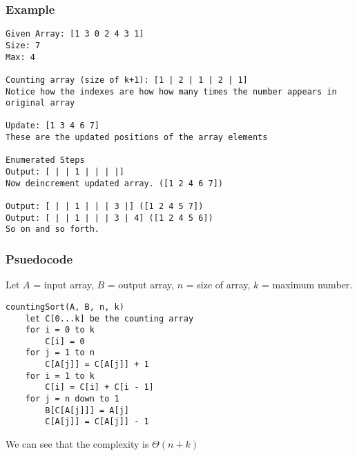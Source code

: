 \documentclass{article}
\begin{document}
\subsubsection{Example}
\begin{verbatim}
Given Array: [1 3 0 2 4 3 1]
Size: 7
Max: 4

Counting array (size of k+1): [1 | 2 | 1 | 2 | 1]
Notice how the indexes are how how many times the number appears in original array

Update: [1 3 4 6 7]
These are the updated positions of the array elements

Enumerated Steps
Output: [ | | 1 | | | |]
Now deincrement updated array. ([1 2 4 6 7])

Output: [ | | 1 | | | 3 |] ([1 2 4 5 7])
Output: [ | | 1 | | | 3 | 4] ([1 2 4 5 6])
So on and so forth.
\end{verbatim}

\subsubsection{Psuedocode}
Let $A$ = input array, $B$ = output array, $n$ = size of array, $k$ = maximum number.
\begin{verbatim}
countingSort(A, B, n, k)
    let C[0...k] be the counting array
    for i = 0 to k
        C[i] = 0
    for j = 1 to n
        C[A[j]] = C[A[j]] + 1
    for i = 1 to k
        C[i] = C[i] + C[i - 1]
    for j = n down to 1
        B[C[A[j]]] = A[j]
        C[A[j]] = C[A[j]] - 1
\end{verbatim}

We can see that the complexity is $\Theta(n+k)$
\end{document}
